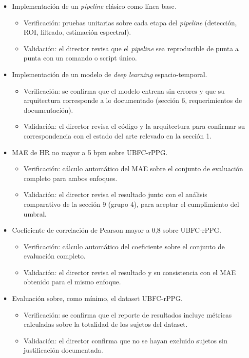 \documentclass[
11pt, %
]{charter}
\begin{document}
\begin{itemize}
		\item Implementación de un \textit{pipeline} clásico como línea base.
		\begin{itemize}
			\item Verificación: pruebas unitarias sobre cada etapa del \textit{pipeline} (detección, ROI, filtrado, estimación espectral).
			\item Validación: el director revisa que el \textit{pipeline} sea reproducible de punta a punta con un comando o script único.
		\end{itemize}
		
		\item Implementación de un modelo de \textit{deep learning} espacio-temporal.
		\begin{itemize}
			\item Verificación: se confirma que el modelo entrena sin errores y que su arquitectura corresponde a lo documentado (sección 6, requerimientos de documentación).
			\item Validación: el director revisa el código y la arquitectura para confirmar su correspondencia con el estado del arte relevado en la sección 1.
		\end{itemize}
		
		\item MAE de HR no mayor a 5 bpm sobre UBFC-rPPG.
		\begin{itemize}
			\item Verificación: cálculo automático del MAE sobre el conjunto de evaluación completo para ambos enfoques.
			\item Validación: el director revisa el resultado junto con el análisis comparativo de la sección 9 (grupo 4), para aceptar el cumplimiento del umbral.
		\end{itemize}
		
		\item Coeficiente de correlación de Pearson mayor a 0,8 sobre UBFC-rPPG.
		\begin{itemize}
			\item Verificación: cálculo automático del coeficiente sobre el conjunto de evaluación completo.
			\item Validación: el director revisa el resultado y su consistencia con el MAE obtenido para el mismo enfoque.
		\end{itemize}
		
		\item Evaluación sobre, como mínimo, el dataset UBFC-rPPG.
		\begin{itemize}
			\item Verificación: se confirma que el reporte de resultados incluye métricas calculadas sobre la totalidad de los sujetos del dataset.
			\item Validación: el director confirma que no se hayan excluido sujetos sin justificación documentada.
		\end{itemize}
		

\end{itemize}
\end{document}
